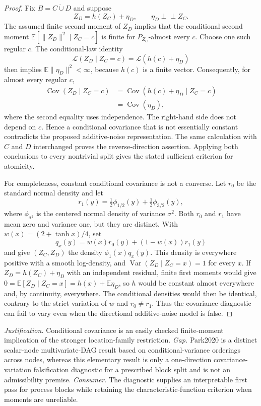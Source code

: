 \documentclass{article}
\begin{document}
\begin{proof}
Fix \(B=C\mathbin{\dot\cup}D\) and suppose
\[
 Z_D=h(Z_C)+\eta_D,
 \qquad \eta_D\perp\!\!\!\perp Z_C.
\]
The assumed finite second moment of \(Z_D\) implies that the conditional second moment \(\mathbb E[\|Z_D\|^2\mid Z_C=c]\) is finite for \(P_{Z_C}\)-almost every \(c\).  Choose one such regular \(c\).  The conditional-law identity
\[
 \mathcal L(Z_D\mid Z_C=c)=\mathcal L(h(c)+\eta_D)
\]
then implies \(\mathbb E\|\eta_D\|^2<\infty\), because \(h(c)\) is a finite vector.  Consequently, for almost every regular \(c\),
\[
 \begin{aligned}
 \operatorname{Cov}(Z_D\mid Z_C=c)
 &=\operatorname{Cov}(h(c)+\eta_D\mid Z_C=c)\\
 &=\operatorname{Cov}(\eta_D),
 \end{aligned}
\]
where the second equality uses independence.  The right-hand side does not depend on \(c\).  Hence a conditional covariance that is not essentially constant contradicts the proposed additive-noise representation.  The same calculation with \(C\) and \(D\) interchanged proves the reverse-direction assertion.  Applying both conclusions to every nontrivial split gives the stated sufficient criterion for atomicity.

For completeness, constant conditional covariance is not a converse.  Let \(r_0\) be the standard normal density and let
\[
 r_1(y)=\tfrac12\phi_{1/2}(y)+\tfrac12\phi_{3/2}(y),
\]
where \(\phi_{\sigma^2}\) is the centered normal density of variance \(\sigma^2\).  Both \(r_0\) and \(r_1\) have mean zero and variance one, but they are distinct.  With \(w(x)=(2+\tanh x)/4\), set
\[
 q_x(y)=w(x)r_0(y)+(1-w(x))r_1(y)
\]
and give \((Z_C,Z_D)\) the density \(\phi_1(x)q_x(y)\).  This density is everywhere positive with a smooth log-density, and \(\operatorname{Var}(Z_D\mid Z_C=x)=1\) for every \(x\).  If \(Z_D=h(Z_C)+\eta_D\) with an independent residual, finite first moments would give \(0=\mathbb E[Z_D\mid Z_C=x]=h(x)+\mathbb E\eta_D\), so \(h\) would be constant almost everywhere and, by continuity, everywhere.  The conditional densities would then be identical, contrary to the strict variation of \(w\) and \(r_0\neq r_1\).  Thus the covariance diagnostic can fail to vary even when the directional additive-noise model is false.
\end{proof}
\par\smallskip\noindent \textit{Justification.} Conditional covariance is an easily checked finite-moment implication of the stronger location-family restriction. \textit{Gap.} Park2020 is a distinct scalar-node multivariate-DAG result based on conditional-variance orderings across nodes, whereas this elementary result is only a one-direction covariance-variation falsification diagnostic for a prescribed block split and is not an admissibility premise. \textit{Consumer.} The diagnostic supplies an interpretable first pass for process blocks while retaining the characteristic-function criterion when moments are unreliable.
\end{document}
